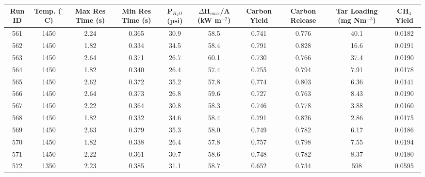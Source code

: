 \documentclass[11pt,twocolumn]{article}
\begin{document}
\begin{minipage}{\textwidth}
\begin{tabulary}{\linewidth}{C C C C C C C C C C}
\toprule
Run ID &  Temp. ($^\circ$C)  &  Max Res Time (s) &  Min Res Time (s) &  P$_{H_2O}$	 (psi)	&	$\Delta$H$_{max}$/A (kW m$^{-2}$) &  Carbon Yield \hspace{5pt} &  Carbon Release &  Tar Loading (mg Nm$^{-3}$) &  CH$_4$ Yield \\
\midrule

561  &       1450 &            2.24 &    0.365 &      30.9	&	58.5 &       0.741 &      0.776 &             40.1 &          0.0182 \\
562  &       1450 &            1.82 &    0.334 &      34.5	&	58.4 &       0.791 &      0.828 &             16.6 &          0.0191 \\
563  &       1450 &            2.64 &    0.371 &      26.7	&	60.1 &       0.730 &      0.766 &             37.4 &          0.0190 \\
564  &       1450 &            1.82 &    0.340 &      26.4	&	57.4 &       0.755 &      0.794 &             7.91 &          0.0178 \\
565  &       1450 &            2.62 &    0.372 &      35.2	&	57.8 &       0.774 &      0.803 &             6.36 &          0.0141 \\
566  &       1450 &            2.64 &    0.373 &      26.8	&	59.6 &       0.727 &      0.763 &             8.43 &          0.0190 \\
567  &       1450 &            2.22 &    0.364 &      30.8	&	58.3 &       0.746 &      0.778 &             3.88 &          0.0160 \\
568  &       1450 &            1.82 &    0.332 &      34.6	&	58.4 &       0.791 &      0.826 &             2.86 &          0.0175 \\
569  &       1450 &            2.63 &    0.379 &      35.3	&	58.0 &       0.749 &      0.782 &             6.17 &          0.0186 \\
570  &       1450 &            1.82 &    0.338 &      26.4	&	57.8 &       0.757 &      0.798 &             7.55 &          0.0194 \\
571  &       1450 &            2.22 &    0.361 &      30.7	&	58.6 &       0.748 &      0.782 &             8.37 &          0.0180 \\
572  &       1350 &            2.23 &    0.385 &      31.1	&	58.7 &       0.652 &      0.734 &              598 &          0.0595 \\

\end{tabulary}
\end{minipage}
\end{document}
